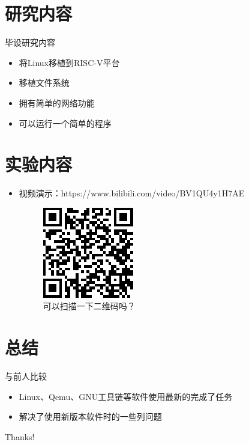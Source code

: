 \documentclass{beamer}
\begin{document}
\section{研究内容}

\begin{frame}{毕设研究内容}
\begin{itemize}
\item 将Linux移植到RISC-V平台
\item 移植文件系统
\item 拥有简单的网络功能
\item 可以运行一个简单的程序
\end{itemize}
\end{frame}

\section{实验内容}
\begin{frame}
	\begin{itemize}
    \item 视频演示：https://www.bilibili.com/video/BV1QU4y1H7AE
    \begin{figure}
        \centering
        \includegraphics[height=0.6\textheight]{pic/演示二维码.png}
        \caption{可以扫描一下二维码吗？}
    \end{figure}
	\end{itemize}
\end{frame}

\section{总结}
\begin{frame}{与前人比较}
    \begin{itemize}
       \item Linux、Qemu、GNU工具链等软件使用最新的完成了任务
       \item 解决了使用新版本软件时的一些列问题
    \end{itemize}
\end{frame}

% 
% 

\begin{frame}
\begin{center}
{\Huge\calligra Thanks!}
\end{center}
\end{frame}
\end{document}
